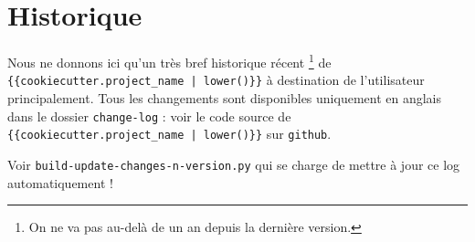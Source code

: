 \documentclass[12pt,a4paper]{book}
\begin{document}
\newpage

\section{Historique}

Nous ne donnons ici qu'un très bref historique récent
\footnote{
	On ne va pas au-delà de un an depuis la dernière version.
}
de \verb+{{cookiecutter.project_name | lower()}}+ à destination de l'utilisateur principalement.
Tous les changements sont disponibles uniquement en anglais dans le dossier \verb+change-log+ : voir le code source de \verb+{{cookiecutter.project_name | lower()}}+ sur \verb+github+.

\begin{description}

    \item Voir \verb+build-update-changes-n-version.py+ qui se charge de mettre à jour ce log automatiquement !

\end{description}
\end{document}

